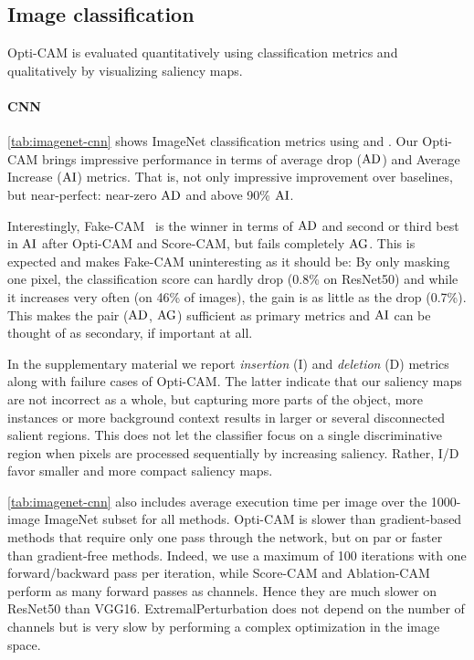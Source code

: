 \subsection{Image classification}

Opti-CAM is evaluated quantitatively using classification metrics and qualitatively by visualizing saliency maps.




\paragraph{CNN}

\autoref{tab:imagenet-cnn} shows ImageNet classification metrics using  and . Our Opti-CAM brings impressive performance in terms of average drop ($\operatorname{AD}$) and Average Increase ($\operatorname{AI}$) metrics. That is, not only impressive improvement over baselines, but near-perfect: near-zero $\operatorname{AD}$ and above 90\% $\operatorname{AI}$. 

Interestingly, Fake-CAM~\citep{poppi2021revisiting} is the winner in terms of $\operatorname{AD}$ and second or third best in $\operatorname{AI}$ after Opti-CAM and Score-CAM, but fails completely $\operatorname{AG}$. This is expected and makes Fake-CAM uninteresting as it should be: By only masking one pixel, the classification score can hardly drop (0.8\% on ResNet50) and while it increases very often (on 46\% of images), the gain is as little as the drop (0.7\%). This makes the pair ($\operatorname{AD}$, $\operatorname{AG}$) sufficient as primary metrics and $\operatorname{AI}$ can be thought of as secondary, if important at all.

In the supplementary material we report \emph{insertion} (I) and \emph{deletion} (D) metrics along with failure cases of Opti-CAM. The latter indicate that our saliency maps are not incorrect as a whole, but capturing more parts of the object, more instances or more background context results in larger or several disconnected salient regions. This does not let the classifier focus on a single discriminative region when pixels are processed sequentially by increasing saliency. Rather, I/D favor smaller and more compact saliency maps.


\autoref{tab:imagenet-cnn} also includes average execution time per image over the 1000-image ImageNet subset for all methods. Opti-CAM is slower than gradient-based methods that require only one pass through the network, but on par or faster than gradient-free methods. Indeed, we use a maximum of 100 iterations with one forward/backward pass per iteration, while Score-CAM and Ablation-CAM perform as many forward passes as channels. Hence they are much slower on ResNet50 than VGG16. ExtremalPerturbation does not depend on the number of channels but is very slow by performing a complex optimization in the image space.

